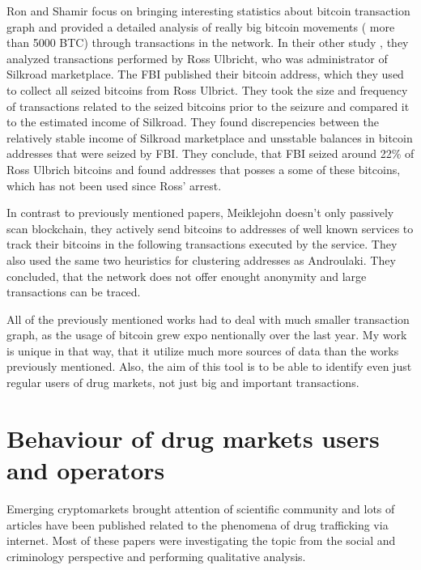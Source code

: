 \documentclass[
  digital, %
  table,   %
  lof,     %
  lot,     %
  oneside
]{fithesis3}
\begin{document}
Ron and Shamir \parencite{ron2013quantitative} focus on bringing
interesting statistics about bitcoin transaction graph
and provided a detailed analysis of really big bitcoin movements ( more than 5000 BTC) 
through transactions in the network.
In their other study \parencite{ron2014did}, they analyzed transactions performed by Ross Ulbricht,
who was administrator of Silkroad marketplace.
The FBI published their bitcoin address, which they used to collect all seized bitcoins from Ross Ulbrict.
They took the size and frequency of transactions related to the seized bitcoins prior to the seizure and compared 
it to the estimated income of Silkroad. They found discrepencies between the
relatively stable income of Silkroad marketplace and unsstable balances in bitcoin addresses
that were seized by FBI. They conclude, that FBI seized around 22\% of Ross Ulbrich bitcoins
and found addresses that posses a some of these bitcoins, which has not been used since Ross' arrest.

In contrast to previously mentioned papers, Meiklejohn \parencite{meiklejohn2013fistful} 
doesn't only passively scan blockchain, they actively send bitcoins to addresses of
well known services to track their bitcoins in the following transactions executed by the service.
They also used the same two heuristics for clustering addresses
as Androulaki. \parencite{androulaki2013evaluating}
They concluded, that the network does not offer enought anonymity and large transactions can be traced.

All of the previously mentioned works had to deal with much smaller transaction graph, as the usage of bitcoin grew expo
nentionally over the last year. 
My work is unique in that way, that it utilize much more sources of data than the works previously mentioned. Also, the 
aim of this tool is to be able
to identify even just regular users of drug markets, not just big and important transactions.

\section{Behaviour of drug markets users and operators}

Emerging cryptomarkets brought attention of scientific community
and lots of articles have been published related to the phenomena of drug trafficking via internet.
Most of these papers were investigating the topic from the social
and criminology perspective and performing qualitative analysis.
\parencite{aldridge2014not}
\parencite{barratt2014use}
\parencite{christin2013traveling}
\parencite{dolliver2015criminogenic}
\parencite{van2013silk}
\parencite{walsh2011drugs}
\parencite{martin2014lost}
\end{document}
